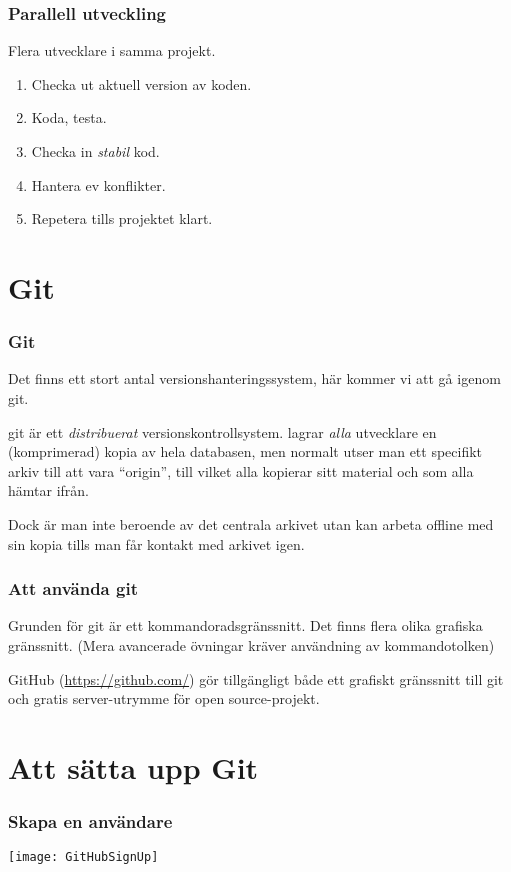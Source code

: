 \documentclass[swedish]{beamer}
\begin{document}
\begin{frame}
\frametitle{Parallell utveckling}

Flera utvecklare i samma projekt.
\begin{enumerate}
\item Checka ut aktuell version av koden.
\item Koda, testa.
\item Checka in \emph{stabil} kod.
\item Hantera ev konflikter.
\item Repetera tills projektet klart.
\end{enumerate}
\end{frame}

\section{Git}
\begin{frame}
\frametitle{Git}
Det finns ett stort antal versionshanteringssystem, här kommer vi att gå igenom git.

  git är ett \emph{distribuerat} versionskontrollsystem.  \Mao lagrar \emph{alla} utvecklare en (komprimerad) kopia av hela databasen, men normalt utser man ett specifikt arkiv till att vara ``origin'', till vilket alla kopierar sitt material och som alla hämtar ifrån.

Dock är man inte beroende av det centrala arkivet utan kan arbeta offline med sin kopia tills man får kontakt med arkivet igen.

\end{frame}

\begin{frame}
  \frametitle{Att använda git}
Grunden för git är ett kommandoradsgränssnitt. Det finns flera olika
grafiska gränssnitt. (Mera avancerade övningar kräver användning av kommandotolken)

GitHub (\url{https://github.com/}) gör tillgängligt både ett grafiskt gränssnitt till git och gratis server-utrymme för open source-projekt.

\end{frame}

\section{Att sätta upp Git}
\begin{frame}
\frametitle{Skapa en användare}
\texttt{[image: GitHubSignUp]}
\end{frame}
\end{document}

